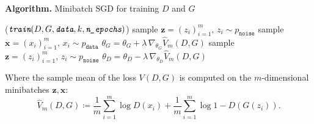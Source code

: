 \documentclass{beamer}
\begin{document}
	\begin{frame}
		\setlength{\algomargin}{2em}
		\begin{algorithm}[H]
			\caption{\vspace{-0.07cm}\textbf{Algorithm.} Minibatch SGD for training $D$ and $G$}
			\DontPrintSemicolon
			\Function($\textit{\texttt{train}}{(D, G, \textit{\texttt{data}}, k, \textit{\texttt{n\_epochs}})}$){
				{
					{
						sample $\mathbf{z} = (z_i)_{i = 1}^{m}, \, z_i \sim p_{\texttt{noise}}$ \;
						sample $\mathbf{x} = (x_i)_{i = 1}^{m}, \, x_i \sim p_{\texttt{data}}$ \;
						$\theta_G = \theta_G + \lambda \, \nabla_{\theta_G} \widehat{V}_m(D, G)$ \;
					}
				sample $\mathbf{z} = (z_i)_{i = 1}^{m}, \, z_i \sim p_{\texttt{noise}}$ \;
				$\theta_D = \theta_D - \lambda \, \nabla_{\theta_D} \widehat{V}_m(D, G)$ \;
				}
			}
		\end{algorithm}
		\medskip 
		Where the sample mean of the loss $V(D, G)$ is computed on the $m$-dimensional minibatches $\mathbf{z}, \mathbf{x}$:
		\vspace{-0.2cm}
		\begin{equation*}
			\widehat{V}_m(D, G) \coloneqq \frac{1}{m} \sum_{i = 1}^{m} \log{D(x_i)} + \frac{1}{m} \sum_{i = 1}^{m} \log{1 - D(G(z_i))}.
		\end{equation*}
	\end{frame}

\end{document}
